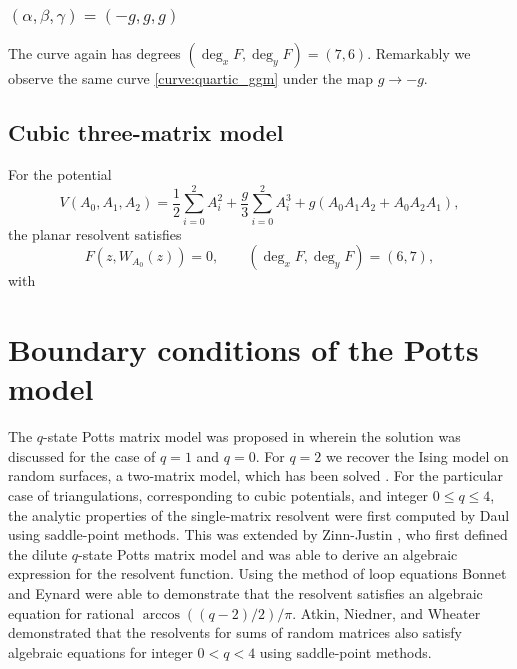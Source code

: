 \subsubsection{$(\alpha,\beta,\gamma)=(-g,g,g)$}

The curve again has degrees $(\deg_xF,\deg_yF)=(7,6)$. Remarkably we observe the same curve \eqref{curve:quartic_ggm} under the map $g\rightarrow -g$.

\subsection{Cubic three-matrix model}
For the potential
\begin{equation}
    V(A_0,A_1,A_2)=\frac12\sum_{i=0}^2A_i^2
    +\frac g3\sum_{i=0}^2A_i^3+g(A_0A_1A_2+A_0A_2A_1),
\end{equation}
the planar resolvent satisfies
\begin{equation}
    F\!\left(z,W_{A_0}(z)\right)=0,
    \qquad (\deg_xF,\deg_yF)=(6,7),
\end{equation}
with


\section{Boundary conditions of the Potts model}

The $q$-state Potts matrix model was proposed in \cite{Kazakov1988} wherein the solution was discussed for
the case of $q = 1$ and $q = 0$. For $q = 2$ we recover the Ising model on random surfaces, a
two-matrix model, which has been solved \cite{Kazakov1986, Boulatov1987, Eynard:2002kg}. For the
particular case of triangulations, corresponding to cubic potentials, and integer $0\leqslant q \leqslant 4$, the analytic
properties of the single-matrix resolvent were first computed by Daul \cite{Daul:1994qy} using
saddle-point methods. This was extended by Zinn-Justin \cite{ZinnJustin:1999jg}, who first defined
the dilute $q$-state Potts matrix model and was able to derive an algebraic expression for the
resolvent function. Using the method of loop equations Bonnet and Eynard \cite{Eynard:1999gp} were
able to demonstrate that the resolvent satisfies an algebraic equation for rational
$\arccos\!\left((q - 2)/2\right) / \pi $. Atkin, Niedner, and Wheater \cite{Atkin:2015ksy}
demonstrated that the resolvents for sums of random matrices also satisfy algebraic equations for
integer $0< q < 4$ using saddle-point methods.

